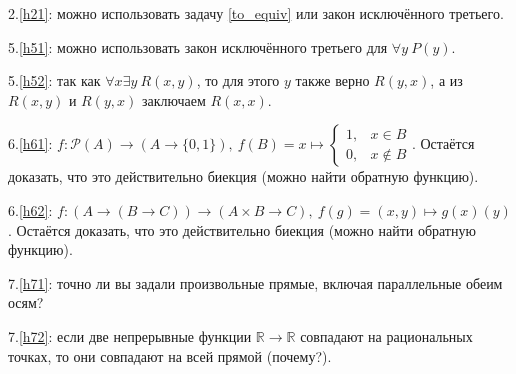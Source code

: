 \documentclass{article}
\newcommand{\R}{\mathbb{R}}
\begin{document}
2.\ref{h21}: можно использовать задачу \ref{to_equiv} или закон исключённого третьего.

5.\ref{h51}: можно использовать закон исключённого третьего для $\forall y~P(y)$.

5.\ref{h52}: так как $\forall x \exists y~R(x,y)$, то для этого $y$ также верно $R(y,x)$, а из $R(x,y)$ и $R(y,x)$ заключаем $R(x,x)$.

6.\ref{h61}: $f: \mathcal{P}(A) \to (A \to \{0,1\}),~f(B) = x \mapsto \begin{cases} 1, & x \in B \\ 0, & x \notin B \end{cases}$. Остаётся доказать, что это действительно биекция (можно найти обратную функцию).

6.\ref{h62}: $f: (A \to (B \to C)) \to (A \times B \to C),~f(g) = (x,y) \mapsto g(x)(y)$. Остаётся доказать, что это действительно биекция (можно найти обратную функцию).

7.\ref{h71}: точно ли вы задали произвольные прямые, включая параллельные обеим осям?

7.\ref{h72}: если две непрерывные функции $\R \to \R$ совпадают на рациональных точках, то они совпадают на всей прямой (почему?).
\end{document}
